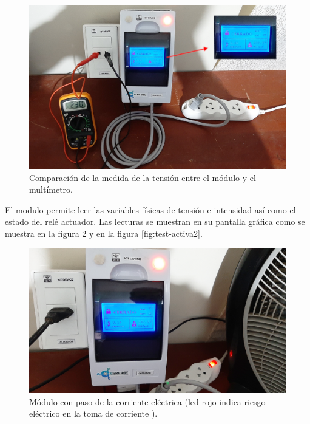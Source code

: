 \begin{figure}[htpb]
\centering 
\includegraphics[width=1.0\textwidth]{./Figures/test/consumo/tension2.png}
\caption{Comparación de la medida de la tensión entre el módulo y el multímetro.}
\label{fig:test-tension}
\end{figure}

El modulo permite leer las variables físicas de tensión e intensidad así como el estado del relé actuador. Las lecturas se muestran en su pantalla gráfica como se muestra en la figura \ref{fig:test-activa1} y en la figura \ref{fig:test-activa2}.
\vspace{0.5cm}
\begin{figure}[htpb]
\centering 
\includegraphics[width=1.0\textwidth]{./Figures/test/consumo/paso.png}
\caption{Módulo con paso de la corriente eléctrica (led rojo indica riesgo eléctrico en la toma de corriente ).}
\label{fig:test-activa1}
\end{figure}

